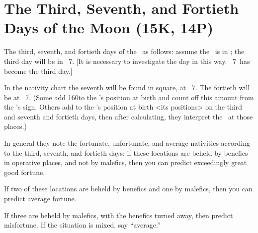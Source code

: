 \section{The Third, Seventh, and Fortieth Days of the Moon (15K, 14P)}
The third, seventh, and fortieth days of the \Moon\, as follows: assume the \Moon\, is in \deg; the third day will be in \Sagittarius\, 7\deg. [It is necessary to investigate the day in this way. \Sagittarius\, 7\deg\, has
become the third day.] 

In the nativity chart the seventh will be found in square, at \Aquarius\, 7\deg. The fortieth will be at \Taurus\, 7\deg. (Some add 160\deg to the \Moon’s position at birth and count off this amount from the \Moon’s sign. Others add to the \Moon’s position at birth <its positions> on the third and seventh and fortieth days, then after calculating, they interpret the \Moon\, at those places.)

\mndl[0.2cm]
In general they note the fortunate, unfortunate, and average nativities according to the third, seventh, and fortieth days: if these locations are beheld by benefics in operative places, and not by malefics, then you can predict exceedingly great good fortune. 

If two of these locations are beheld by benefics and one by malefics, then you can predict average fortune. 

If three are beheld by malefics, with the benefics turned
away, then predict misfortune. If the situation is mixed, say “average.”

\newpage